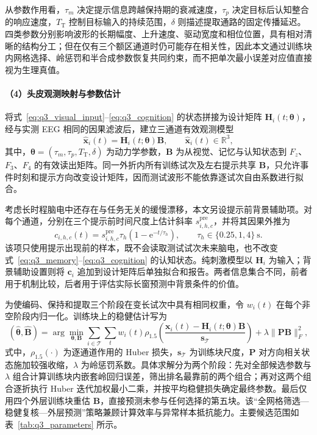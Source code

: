 \documentclass[a4paper]{ctexart}
\numberwithin{figure}{section}       %
\begin{document}
从参数作用看，$\tau_m$ 决定提示信息跨越保持期的衰减速度，$\tau_p$ 决定目标后认知整合的响应速度，$T_{\mathrm T}$ 控制目标输入的持续范围，$\delta$ 则描述提取通路的固定传播延迟。四类参数分别影响波形的长期幅度、上升速度、驱动宽度和相位位置，具有相对清晰的结构分工；但在仅有三个额区通道时仍可能存在相关性，因此本文通过训练块内网格选择、岭惩罚和半合成参数恢复共同约束，而不把单次最小误差对应值直接视为生理真值。

\paragraph{（4）头皮观测映射与参数估计}

将式~\eqref{eq:q3_visual_input}--\eqref{eq:q3_cognition} 的状态拼接为设计矩阵 $\boldsymbol H_i(t;\boldsymbol\theta)$，经与实测 EEG 相同的因果滤波后，建立三通道有效观测模型
\begin{equation}
\widehat{\boldsymbol x}_i(t)=\boldsymbol H_i(t;\boldsymbol\theta)\boldsymbol B,
\qquad \widehat{\boldsymbol x}_i(t)\in\mathbb R^3,
\tag{3-6}
\label{eq:q3_observation}
\end{equation}
其中，$\boldsymbol\theta=(\tau_m,\tau_p,T_{\mathrm T},\delta)$ 为动力学参数，$\boldsymbol B$ 为从视觉、记忆与认知状态到 $F_z$、$F_3$、$F_4$ 的有效读出矩阵。同一外折内所有训练试次及左右提示共享 $\boldsymbol B$，只允许事件时刻和提示方向改变设计矩阵，因而测试波形不能依靠逐试次自由系数进行拟合。

考虑长时程脑电中还存在与任务无关的缓慢漂移，本文另设提示前背景辅助项。对每个通道，分别在三个提示前时间尺度上估计斜率 $s_{i,h,c}^{\mathrm{pre}}$，并将其因果外推为
\[
c_{i,h,c}(t)=s_{i,h,c}^{\mathrm{pre}}\tau_h
\left(1-\mathrm e^{-t/\tau_h}\right),
\qquad \tau_h\in\{0.25,1,4\}~\mathrm{s}.
\]
该项只使用提示出现前的样本，既不会读取测试试次未来脑电，也不改变式~\eqref{eq:q3_memory}--\eqref{eq:q3_cognition} 的认知状态。纯刺激模型以 $\boldsymbol H_i$ 为输入；背景辅助设置则将 $\boldsymbol c_i$ 追加到设计矩阵后单独拟合和报告。两者信息集合不同，前者用于机制比较，后者用于评估实际长窗预测中背景条件的价值。

为使编码、保持和提取三个阶段在变长试次中具有相同权重，令 $w_i(t)$ 在每个非空阶段内归一化。训练块上的稳健估计写为
\begin{equation}
(\widehat{\boldsymbol\theta},\widehat{\boldsymbol B})
=\arg\min_{\boldsymbol\theta,\boldsymbol B}
\sum_{i\in\mathcal T}\sum_t w_i(t)
\rho_{1.5}\!\left(
\frac{\boldsymbol x_i(t)-\boldsymbol H_i(t;\boldsymbol\theta)\boldsymbol B}
{\boldsymbol s_{\mathcal T}}
\right)
+\lambda\|\boldsymbol P\boldsymbol B\|_F^2,
\tag{3-7}
\label{eq:q3_fit}
\end{equation}
式中，$\rho_{1.5}(\cdot)$ 为逐通道作用的 Huber 损失，$\boldsymbol s_{\mathcal T}$ 为训练块尺度，$\boldsymbol P$ 对方向相关状态施加较强收缩，$\lambda$ 为岭惩罚系数。具体求解分为两个阶段：先对全部候选参数与 $\lambda$ 组合计算训练块内嵌套岭回归误差，筛出排名最靠前的两个组合；再对这两个组合逐折执行 Huber 迭代加权最小二乘，并按平均稳健损失确定最终参数。最后仅用四个外层训练块重估 $\boldsymbol B$，直接预测未参与任何选择的第五块。该“全网格筛选---稳健复核---外层预测”策略兼顾计算效率与异常样本抵抗能力。主要候选范围如表~\ref{tab:q3_parameters} 所示。
\end{document}
